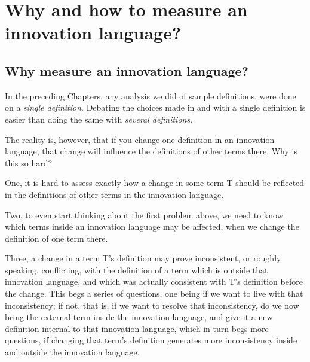 \chapter{Why and how to measure an innovation language?}
\label{c7}


\section{Why measure an innovation language?}
\label{c7:s1}
In the preceding Chapters, any analysis we did of sample definitions, were done on a \textit{single definition}. Debating the choices made in and with a single definition is easier than doing the same with \textit{several definitions}. 

The reality is, however, that if you change one definition in an innovation language, that change will influence the definitions of other terms there. Why is this so hard?

One, it is hard to assess exactly how a change in some term T should be reflected in the definitions of other terms in the innovation language. 

Two, to even start thinking about the first problem above, we need to know which terms inside an innovation language may be affected, when we change the definition of one term there.

Three, a change in a term T's definition may prove inconsistent, or roughly speaking, conflicting, with the definition of a term which is outside that innovation language, and which was actually consistent with T's definition before the change. This begs a series of questions, one being if we want to live with that inconsistency; if not, that is, if we want to resolve that inconsistency, do we now bring the external term inside the innovation language, and give it a new definition internal to that innovation language, which in turn begs more questions, if changing that term's definition generates more inconsistency inside and outside the innovation language.


